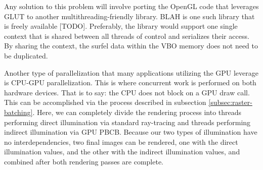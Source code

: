 Any solution to this problem will involve porting the OpenGL code that leverages GLUT to another multithreading-friendly library. BLAH is one such library that is freely available [TODO]. Preferably, the library would support one single context that is shared between all threads of control and serializes their access. By sharing the context, the surfel data within the VBO memory does not need to be duplicated.

Another type of parallelization that many applications utilizing the GPU leverage is CPU-GPU parallelization. This is where concurrent work is performed on both hardware devices. That is to say: the CPU does not block on a GPU draw call. This can be accomplished via the process described in subsection \ref{subsec:raster-batching}. Here, we can completely divide the rendering process into threads performing direct illumination via standard ray-tracing and threads performing indirect illumination via GPU PBCB. Because our two types of illumination have no interdependencies, two final images can be rendered, one with the direct illumination values, and the other with the indirect illumination values, and combined after both rendering passes are complete.

